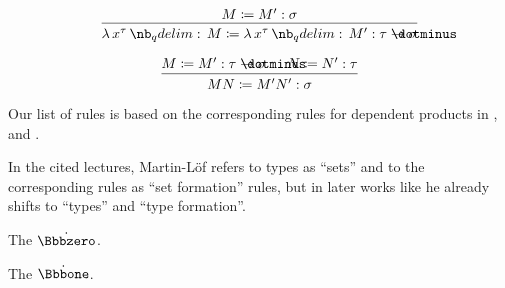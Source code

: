 \begin{remark}
\begin{thmenum}
\begin{thmenum}
      \begin{paracol}{2}
        \begin{leftcolumn}
          \phantom{alignment hack}
          \begin{equation*}
            \begin{prooftree}
              \hypo{ M \coloneqq M': \sigma }
              \infer1{ \qabs {x^{\tau}} M \coloneqq \qabs {x^{\tau}} M': \tau \synimplies \sigma }
            \end{prooftree}
          \end{equation*}
        \end{leftcolumn}

        \begin{rightcolumn}
          \phantom{alignment hack}
          \begin{equation*}
            \begin{prooftree}
              \hypo{ M \coloneqq M': \tau \synimplies \sigma }
              \hypo{ N \coloneqq N': \tau }
              \infer2{ M N \coloneqq M' N': \sigma }
            \end{prooftree}
          \end{equation*}
        \end{rightcolumn}
      \end{paracol}
    \end{thmenum}
  \end{thmenum}
\end{remark}
\begin{comments}
  \item Our list of rules is based on the corresponding rules for dependent products in , \cite[\S A.2]{UnivalentProject2024OctoberHoTT} and \cite[\S 8.1.10]{Mimram2020ProgramEqualsProof}.

  \item In the cited lectures, Martin-L\"of refers to types as \enquote{sets} and to the corresponding rules as \enquote{set formation} rules, but in later works like \cite{MartinLöf1994TypeJudgments} he already shifts to \enquote{types} and \enquote{type formation}.
\end{comments}

\begin{definition}\label{def:empty_type}
  The  \( \syn\Bbbzero \).
\end{definition}

\begin{definition}\label{def:unit_type}
  The  \( \syn\Bbbone \).
\end{definition}

